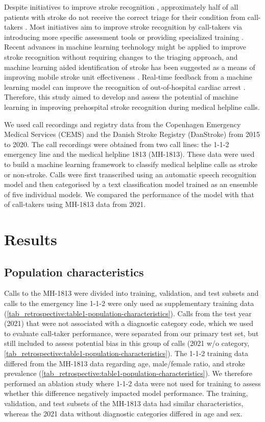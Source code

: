 {Despite initiatives to improve stroke recognition \cite{cite8,cite9}, approximately half of all patients with stroke do not receive the correct triage for their condition from call-takers \cite{cite10,cite11,cite12}. Most initiatives aim to improve stroke recognition by call-takers via introducing more specific assessment tools \cite{cite8,cite9} or providing specialized training \cite{cite13}. Recent advances in machine learning technology might be applied to improve stroke recognition without requiring changes to the triaging approach, and machine learning aided identification of stroke has been suggested as a means of improving mobile stroke unit effectiveness \cite{cite7}. Real-time feedback from a machine learning model can improve the recognition of out-of-hospital cardiac arrest \cite{cite14,cite15}. Therefore, this study aimed to develop and assess the potential of machine learning in improving prehospital stroke recognition during medical helpline calls.

We used call recordings and registry data from the Copenhagen Emergency Medical Services (CEMS) and the Danish Stroke Registry (DanStroke)\cite{cite16} from 2015 to 2020. The call recordings were obtained from two call lines: the 1-1-2 emergency line and the medical helpline 1813 (MH-1813). These data were used to build a machine learning framework to classify medical helpline calls as stroke or non-stroke. Calls were first transcribed using an automatic speech recognition model and then categorised by a text classification model trained as an ensemble of five individual models. We compared the performance of the model with that of call-takers using MH-1813 data from 2021.



\section{Results}

\subsection{Population characteristics}
%
Calls to the MH-1813 were divided into training, validation, and test subsets and calls to the emergency line 1-1-2 were only used as supplementary training data (\cref{tab_retrospective:table1-population-characteristics}). Calls from the test year (2021) that were not associated with a diagnostic category code, which we used to evaluate call-taker performance, were separated from our primary test set, but still included to assess potential bias in this group of calls (2021 w/o category, \cref{tab_retrospective:table1-population-characteristics}).  The 1-1-2 training data differed from the MH-1813 data regarding age, male/female ratio, and stroke prevalence (\cref{tab_retrospective:table1-population-characteristics}). We therefore performed an ablation study where 1-1-2 data were not used for training to assess whether this difference negatively impacted model performance. The training, validation, and test subsets of the MH-1813 data had similar characteristics, whereas the 2021 data without diagnostic categories differed in age and sex.

}
